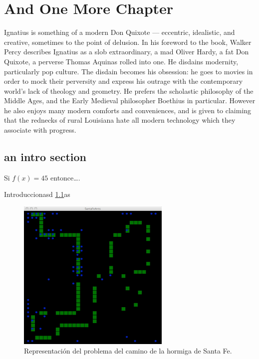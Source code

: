 \chapter{And One More Chapter}\label{ch:z}

Ignatius is something of a modern Don Quixote --- eccentric, idealistic, and creative, sometimes to the point of delusion. In his foreword to the book, Walker Percy describes Ignatius as a slob extraordinary, a mad Oliver Hardy, a fat Don Quixote, a perverse Thomas Aquinas rolled into one. He disdains modernity, particularly pop culture. The disdain becomes his obsession: he goes to movies in order to mock their perversity and express his outrage with the contemporary world's lack of theology and geometry. He prefers the scholastic philosophy of the Middle Ages, and the Early Medieval philosopher Boethius in particular. However he also enjoys many modern comforts and conveniences, and is given to claiming that the rednecks of rural Louisiana hate all modern technology which they associate with progress.

\section{an intro section}\label{sec:z1}

Si $f(x)= 45$ entonce\ldots.

Introduccionasd \ref{fig:santa-fe}as


\begin{figure}[t]
\centering
\includegraphics[width=0.65\textwidth]{figs/santa-fe-trail}
\caption{Representación del problema del camino de la hormiga de Santa Fe.}
\label{fig:santa-fe}
\end{figure}



